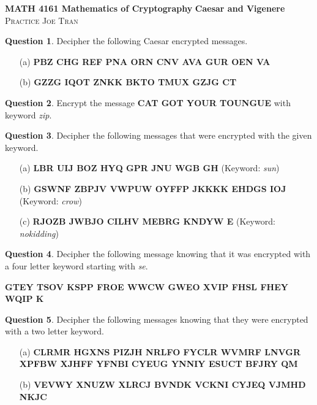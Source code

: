 \documentclass[11pt]{amsart}
\theoremstyle{definition}\newtheorem{question}{Question}
\begin{document}
\noindent \textbf{MATH 4161 Mathematics of Cryptography} \hfill \textbf{Caesar and Vigenere} \\
\noindent \textsc{Practice} \hfill \textsc{Joe Tran}

\begin{question}
    Decipher the following Caesar encrypted messages.
    \begin{itemize}
        \item[(a)] \textbf{\textsf{PBZ CHG REF PNA ORN CNV AVA GUR OEN VA}}
        \item[(b)] \textbf{\textsf{GZZG IQOT ZNKK BKTO TMUX GZJG CT}}
    \end{itemize}
\end{question}

\begin{question}
    Encrypt the message \textbf{\textsf{CAT GOT YOUR TOUNGUE}} with keyword \emph{zip}.
\end{question}

\begin{question}
    Decipher the following messages that were encrypted with the given keyword.
    \begin{itemize}
        \item[(a)] \textbf{\textsf{LBR UIJ BOZ HYQ GPR JNU WGB GH}} (Keyword: \emph{sun})
        \item[(b)] \textbf{\textsf{GSWNF ZBPJV VWPUW OYFFP JKKKK EHDGS IOJ}} (Keyword: \emph{crow})
        \item[(c)] \textbf{\textsf{RJOZB JWBJO CILHV MEBRG KNDYW E}} (Keyword: \emph{nokidding})
    \end{itemize}
\end{question}

\begin{question}
    Decipher the following message knowing that it was encrypted with a four letter keyword starting with \emph{se}.
    \begin{center}
        \textbf{\textsf{GTEY TSOV KSPP FROE WWCW GWEO XVIP FHSL FHEY WQIP K}}
    \end{center}
\end{question}

\begin{question}
    Decipher the following messages knowing that they were encrypted with a two letter keyword.
    \begin{itemize}
        \item[(a)] \textbf{\textsf{CLRMR HGXNS PIZJH NRLFO FYCLR WVMRF LNVGR XPFBW XJHFF YFNBI CYEUG YNNIY ESUCT BFJRY QM}}
        \item[(b)] \textbf{\textsf{VEVWY XNUZW XLRCJ BVNDK VCKNI CYJEQ VJMHD NKJC}}
    \end{itemize}
\end{question}
\end{document}
